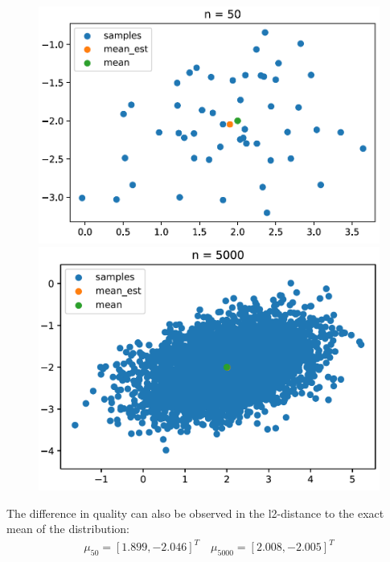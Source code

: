 \documentclass[DIV=12, ngerman, fontsize=12pt, parskip=half]{scrreprt}
\begin{document}
	\begin{figure}[H]
	\begin{center}
		\begin{minipage}[t]{0.4\textwidth}
			\includegraphics[width=\textwidth]{Task1_Mean_50_png}
		\end{minipage}
		\begin{minipage}[t]{0.4\textwidth}
			\includegraphics[width=\textwidth]{Task1_Mean_5000_png}
		\end{minipage}
	\end{center}
	\end{figure}

	The difference in quality can also be observed in the l2-distance to the exact mean of the distribution:
	\begin{align*}
		\mu_{50} = [1.899, -2.046]^T \quad \mu_{5000} = [2.008, -2.005]^T  
	\end{align*} 
\end{document}
